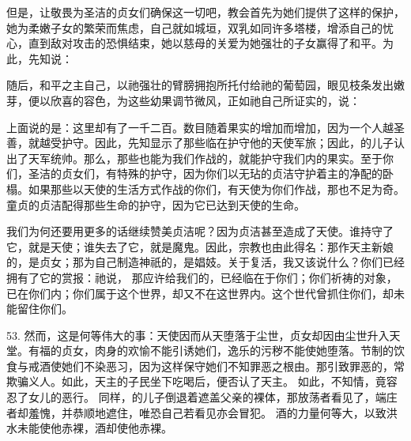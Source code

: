 但是，让敬畏为圣洁的贞女们确保这一切吧，教会首先为她们提供了这样的保护，她为柔嫩子女的繁荣而焦虑，自己就如城垣，双乳如同许多塔楼，增添自己的忧心，直到敌对攻击的恐惧结束，她以慈母的关爱为她强壮的子女赢得了和平。为此，先知说：\par

随后，和平之主自己，以祂强壮的臂膀拥抱所托付给祂的葡萄园，眼见枝条发出嫩芽，便以欣喜的容色，为这些幼果调节微风，正如祂自己所证实的，说：\par

上面说的是：这里却有了一千二百。数目随着果实的增加而增加，因为一个人越圣善，就越受护守。因此，先知显示了那些临在护守他的天使军旅；因此，的儿子认出了天军统帅。那么，那些也能为我们作战的，就能护守我们内的果实。至于你们，圣洁的贞女们，有特殊的护守，因为你们以无玷的贞洁守护着主的净配的卧榻。如果那些以天使的生活方式作战的你们，有天使为你们作战，那也不足为奇。童贞的贞洁配得那些生命的护守，因为它已达到天使的生命。\par

我们为何还要用更多的话继续赞美贞洁呢？因为贞洁甚至造成了天使。谁持守了它，就是天使；谁失去了它，就是魔鬼。因此，宗教也由此得名：那作天主新娘的，是贞女；那为自己制造神祇的，是娼妓。关于复活，我又该说什么？你们已经拥有了它的赏报：祂说， 那应许给我们的，已经临在于你们；你们祈祷的对象，已在你们内；你们属于这个世界，却又不在这世界内。这个世代曾抓住你们，却未能留住你们。\par

53. 然而，这是何等伟大的事：天使因而从天堕落于尘世，贞女却因由尘世升入天堂。有福的贞女，肉身的欢愉不能引诱她们，逸乐的污秽不能使她堕落。节制的饮食与戒酒使她们不染恶习，因为这样保守她们不知罪恶之根由。那引致罪恶的，常欺骗义人。如此，天主的子民坐下吃喝后，便否认了天主。 如此，不知情，竟容忍了女儿的恶行。 同样，的儿子倒退着遮盖父亲的裸体，那放荡者看见了，端庄者却羞愧，并恭顺地遮住，唯恐自己若看见亦会冒犯。 酒的力量何等大，以致洪水未能使他赤裸，酒却使他赤裸。\par


